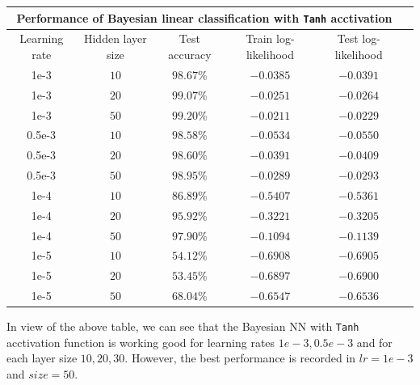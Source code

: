 \documentclass[12pt, fullpage,letterpaper]{article}
\begin{document}
\begin{enumerate}
\begin{enumerate}
{\begin{center}
\begin{tabular}{ |c||c|c|c|c|c|}
 \hline
 \multicolumn{5}{|c|}{Performance of Bayesian linear classification with \texttt{Tanh} acctivation} \\
 \hline
Learning rate & Hidden layer size & Test accuracy & Train log-likelihood &  Test log-likelihood\\
 \hline
 1e-3   & $10$    & $98.67\%$ &   $-0.0385$ & $-0.0391$\\ 
 \hline
 1e-3   & $20$    & $99.07\%$ &   $-0.0251$ & $-0.0264$\\
 \hline
 1e-3   & $50$    & $99.20\%$ &  $-0.0211$  & $-0.0229$\\
  \hline
  \hline
 0.5e-3   & $10$    & $98.58\%$ &   $-0.0534$ & $-0.0550$\\  
 \hline
 0.5e-3   & $20$    & $98.60\%$ &   $-0.0391$ & $-0.0409$\\
\hline
 0.5e-3   & $50$    & $98.95\%$ &   $-0.0289$ & $-0.0293$\\
 \hline
 \hline
 1e-4   & $10$    & $86.89\%$ &   $-0.5407$ & $-0.5361$\\  
 \hline
 1e-4   & $20$    & $95.92\%$ &   $-0.3221$ & $-0.3205$\\
\hline
 1e-4   & $50$    & $97.90\%$ &   $-0.1094$ & $-0.1139$ \\ 
 \hline
 \hline
 1e-5   & $10$    & $54.12\%$ & $-0.6908$     &  $-0.6905$\\  
 \hline
 1e-5   & $20$    & $53.45\%$ &   $-0.6897$ & $-0.6900$\\
\hline
 1e-5   & $50$    & $68.04\%$ &   $-0.6547$  & $-0.6536$\\
 \hline
\end{tabular}
\end{center}
In view of the above table, we can see that the Bayesian NN with \texttt{Tanh} acctivation function is working good for learning rates $1e-3, 0.5e-3$ and for each layer size $10,20,30$. However, the best performance is recorded in $lr =1e-3$ and $size = 50$.

}
\end{enumerate}
\end{enumerate}
\end{document}
